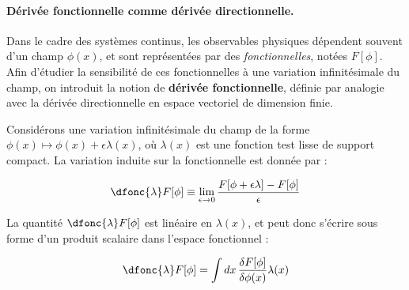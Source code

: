 %


\begin{mdframed}[
	linewidth=0.5pt, 
	backgroundcolor=gray!5, 
	roundcorner=50pt,	
	innerleftmargin=5pt,
    innerrightmargin=5pt,
    innertopmargin=5pt,
    innerbottommargin=2pt,
    leftmargin=2pt,
    rightmargin=2pt
	]
\paragraph{Dérivée fonctionnelle comme dérivée directionnelle.}

Dans le cadre des systèmes continus, les observables physiques dépendent souvent d'un champ $\phi(x)$, et sont représentées par des \emph{fonctionnelles}, notées $F[\phi]$. Afin d'étudier la sensibilité de ces fonctionnelles à une variation infinitésimale du champ, on introduit la notion de \textbf{dérivée fonctionnelle}, définie par analogie avec la dérivée directionnelle en espace vectoriel de dimension finie.

Considérons une variation infinitésimale du champ de la forme $\phi(x) \mapsto \phi(x) + \epsilon \lambda(x)$, où $\lambda(x)$ est une fonction test lisse de support compact. La variation induite sur la fonctionnelle est donnée par :

\begin{equation}\label{chap2:eq.diff.q.1}
	\dfonc{\lambda} F[\phi] \equiv \lim_{\epsilon \to 0} \frac{F[\phi + \epsilon \lambda] - F[\phi]}{\epsilon}
\end{equation}

La quantité $\dfonc{\lambda} F[\phi]$ est linéaire en $\lambda(x)$, et peut donc s’écrire sous forme d’un produit scalaire dans l’espace fonctionnel :

\begin{equation}\label{chap2:eq.diff.q.2}
	\dfonc{\lambda} F[\phi] = \int dx \, \frac{\delta F[\phi]}{\delta \phi(x)} \lambda(x)
\end{equation}


\end{mdframed}

